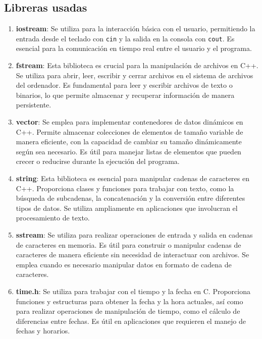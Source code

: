 \documentclass{article}
\begin{document}
    \subsection[Librerias]{Libreras usadas}

        \begin{enumerate}
            \item \textbf{iostream}: Se utiliza para la interacción básica con el usuario, permitiendo la entrada desde el teclado con
            \texttt{cin} y la salida en la consola con \texttt{cout}. Es esencial para la comunicación en tiempo real entre el usuario
            y el programa.

            \item \textbf{fstream}: Esta biblioteca es crucial para la manipulación de archivos en C++. Se utiliza para abrir, leer,
            escribir y cerrar archivos en el sistema de archivos del ordenador. Es fundamental para leer y escribir archivos de texto
            o binarios, lo que permite almacenar y recuperar información de manera persistente.

            \item \textbf{vector}: Se emplea para implementar contenedores de datos dinámicos en C++. Permite almacenar colecciones de
            elementos de tamaño variable de manera eficiente, con la capacidad de cambiar su tamaño dinámicamente según sea necesario.
            Es útil para manejar listas de elementos que pueden crecer o reducirse durante la ejecución del programa.

            \item \textbf{string}: Esta biblioteca es esencial para manipular cadenas de caracteres en C++. Proporciona clases y
            funciones para trabajar con texto, como la búsqueda de subcadenas, la concatenación y la conversión entre diferentes
            tipos de datos. Se utiliza ampliamente en aplicaciones que involucran el procesamiento de texto.

            \item \textbf{sstream}: Se utiliza para realizar operaciones de entrada y salida en cadenas de caracteres en memoria. Es
            útil para construir o manipular cadenas de caracteres de manera eficiente sin necesidad de interactuar con archivos. Se
            emplea cuando es necesario manipular datos en formato de cadena de caracteres.

            \item \textbf{time.h}: Se utiliza para trabajar con el tiempo y la fecha en C. Proporciona funciones y estructuras para
            obtener la fecha y la hora actuales, así como para realizar operaciones de manipulación de tiempo, como el cálculo de
            diferencias entre fechas. Es útil en aplicaciones que requieren el manejo de fechas y horarios.


\end{enumerate}
\end{document}
